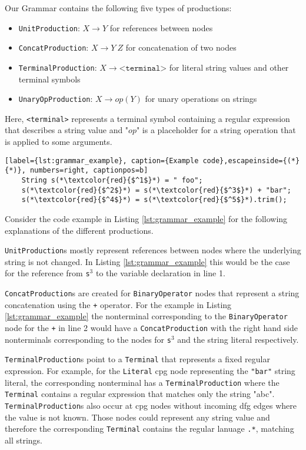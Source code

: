 Our Grammar contains the following five types of productions:
\begin{itemize}
	\item \lstinline|UnitProduction|:  $X \rightarrow Y$ for references between nodes
	\item \lstinline|ConcatProduction|: $X \rightarrow Y\ Z$ for concatenation of two nodes
	\item \lstinline|TerminalProduction|: $X \rightarrow \texttt{<terminal>}$ for literal string values and other terminal symbols
	\item \lstinline|UnaryOpProduction|: $X \rightarrow op(Y)$ for unary operations on strings
\end{itemize}

Here, \texttt{<terminal>} represents a terminal symbol containing a regular expression that describes a string value and "$op$" is a placeholder for a string operation that is applied to some arguments.

\begin{lstlisting}[label={lst:grammar_example}, caption={Example code},escapeinside={(*}{*)}, numbers=right, captionpos=b]
	String s(*\textcolor{red}{$^1$}*) = " foo";
	s(*\textcolor{red}{$^2$}*) = s(*\textcolor{red}{$^3$}*) + "bar";
	s(*\textcolor{red}{$^4$}*) = s(*\textcolor{red}{$^5$}*).trim();
\end{lstlisting}

Consider the code example in Listing \ref{lst:grammar_example} for the following explanations of the different productions.

\lstinline|UnitProduction|s mostly represent references between nodes where the underlying string is not changed. In Listing \ref{lst:grammar_example} this would be the case for the reference from \lstinline|s|$^3$ to the variable declaration in line 1. 

\lstinline|ConcatProduction|s are created for \lstinline|BinaryOperator| nodes that represent a string concatenation using the \lstinline|+| operator. For the example in Listing \ref{lst:grammar_example} the nonterminal corresponding to the \lstinline|BinaryOperator| node for the \lstinline|+| in line 2 would have a \lstinline|ConcatProduction| with the right hand side nonterminals corresponding to the nodes for \lstinline|s|$^3$ and the string literal respectively.

\lstinline|TerminalProduction|s point to a \lstinline|Terminal| that represents a fixed regular expression.
For example, for the \lstinline|Literal| \ac{cpg} node representing the \lstinline|"bar"| string literal, the corresponding nonterminal has a \lstinline|TerminalProduction| where the \lstinline|Terminal| contains a regular expression that matches only the string "abc". \lstinline|TerminalProduction|s also occur at \ac{cpg} nodes without incoming \ac{dfg} edges where the value is not known. Those nodes could represent any string value and therefore the corresponding \lstinline|Terminal| contains the regular lanuage \lstinline|.*|, matching all strings.

